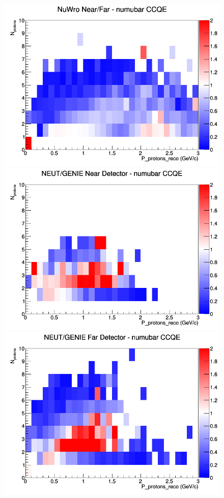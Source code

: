 \begin{figure}[h]
\endminipage
{}
\includegraphics[width=\linewidth]{eff_N_P/FGT/protons/ratios/CCQE_NuWro_numubar_NF_N_P.png}
\endminipage
\newline
{}
\includegraphics[width=\linewidth]{eff_N_P/FGT/protons/ratios/CCQE_NEUT_GENIE_numubar_near_N_P.png}
\endminipage
{}
\includegraphics[width=\linewidth]{eff_N_P/FGT/protons/ratios/CCQE_NEUT_GENIE_numubar_far_N_P.png}

\end{figure}
